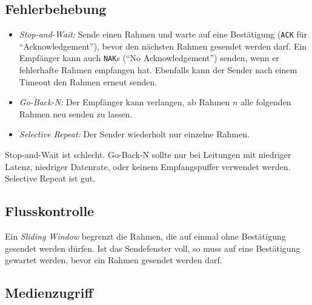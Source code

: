 \documentclass[a4paper,parskip=half*,DIV=15,fontsize=11pt]{scrartcl}
\begin{document}
\subsection{Fehlerbehebung}

\begin{itemize}
\item \emph{Stop-and-Wait:} Sende einen Rahmen und warte auf eine Bestätigung (\lstinline{ACK} für ``Acknowledgement''), bevor den nächsten Rahmen gesendet werden darf. Ein Empfänger kann auch \lstinline{NAK}s (``No Acknowledgement'') senden, wenn er fehlerhafte Rahmen empfangen hat. Ebenfalls kann der Sender nach einem Timeout den Rahmen erneut senden.
\item \emph{Go-Back-N:} Der Empfänger kann verlangen, ab Rahmen $n$ alle folgenden Rahmen neu senden zu lassen.
\item \emph{Selective Repeat:} Der Sender wiederholt nur einzelne Rahmen.
\end{itemize}

Stop-and-Wait ist schlecht. Go-Back-N sollte nur bei Leitungen mit niedriger Latenz, niedriger Datenrate, oder keinem Empfangspuffer verwendet werden. Selective Repeat ist gut.

\subsection{Flusskontrolle}

Ein \emph{Sliding Window} begrenzt die Rahmen, die auf einmal ohne Bestätigung gesendet werden dürfen. Ist das Sendefenster voll, so muss auf eine Bestätigung gewartet werden, bevor ein Rahmen gesendet werden darf.

\subsection{Medienzugriff}
\end{document}
